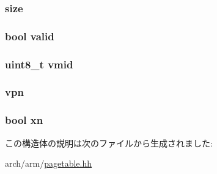 \hypertarget{structArmISA_1_1TlbEntry_a8ce507144b5ef53350af753eafb669f0}{
\subsubsection[{size}]{ {\bf size}}}
\label{structArmISA_1_1TlbEntry_a8ce507144b5ef53350af753eafb669f0}
\hypertarget{structArmISA_1_1TlbEntry_a28e3c179a86f337095088b3ca02a2b2a}{
\subsubsection[{valid}]{\setlength{\rightskip}{0pt plus 5cm}bool {\bf valid}}}
\label{structArmISA_1_1TlbEntry_a28e3c179a86f337095088b3ca02a2b2a}
\hypertarget{structArmISA_1_1TlbEntry_add293169f7f2ac526b3fa14f950cf0bb}{
\subsubsection[{vmid}]{\setlength{\rightskip}{0pt plus 5cm}uint8\_\-t {\bf vmid}}}
\label{structArmISA_1_1TlbEntry_add293169f7f2ac526b3fa14f950cf0bb}
\hypertarget{structArmISA_1_1TlbEntry_ad378f7d20675898b2a5994600528fa9a}{
\subsubsection[{vpn}]{ {\bf vpn}}}
\label{structArmISA_1_1TlbEntry_ad378f7d20675898b2a5994600528fa9a}
\hypertarget{structArmISA_1_1TlbEntry_aa0cd1c167e9b1ae45c71739eaf0460a6}{
\subsubsection[{xn}]{\setlength{\rightskip}{0pt plus 5cm}bool {\bf xn}}}
\label{structArmISA_1_1TlbEntry_aa0cd1c167e9b1ae45c71739eaf0460a6}


この構造体の説明は次のファイルから生成されました:\begin{DoxyCompactItemize}
\item 
arch/arm/\hyperlink{arm_2pagetable_8hh}{pagetable.hh}\end{DoxyCompactItemize}
